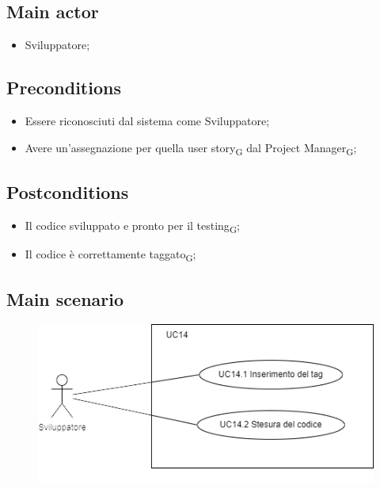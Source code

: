\documentclass{article}
\begin{document}
    \subsection*{Main actor}
        \begin{itemize}
            \item Sviluppatore;
        \end{itemize}
    
    \subsection*{Preconditions}
        \begin{itemize}
            \item Essere riconosciuti dal sistema come Sviluppatore;
            \item Avere un'assegnazione per quella user story\textsubscript{G} dal Project Manager\textsubscript{G};
        \end{itemize}
        
    \subsection*{Postconditions} 
        \begin{itemize}
            \item Il codice sviluppato e pronto per il testing\textsubscript{G};
            \item Il codice è correttamente taggato\textsubscript{G};  
        \end{itemize}
    
    \subsection*{Main scenario}
        \begin{figure}[h]
          \centering
          \includegraphics{./imgUML/UC14-zoom.png}
          \label{fig:immagine}
        \end{figure}
        
\end{document}
